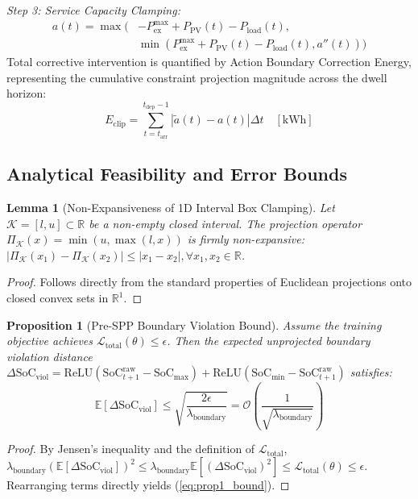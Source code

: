 \documentclass[journal]{IEEEtran}
\newtheorem{lemma}{Lemma}
\newtheorem{proposition}{Proposition}
\theoremstyle{remark}
\begin{document}
\textit{Step 3: Service Capacity Clamping:}
\begin{align}
a(t) = \max\Big( &-P_{\mathrm{ex}}^{\max} + P_{\mathrm{PV}}(t) - P_{\mathrm{load}}(t), \nonumber\\
&\min\left(P_{\mathrm{ex}}^{\max} + P_{\mathrm{PV}}(t) - P_{\mathrm{load}}(t), a''(t)\right)\Big)
\label{eq:spp_step3}
\end{align}
Total corrective intervention is quantified by Action Boundary Correction Energy, representing the cumulative constraint projection magnitude across the dwell horizon:
\begin{equation}
E_{\mathrm{clip}} = \sum_{t=t_{\mathrm{arr}}}^{t_{\mathrm{dep}}-1} |\tilde{a}(t) - a(t)| \Delta t \quad [\text{kWh}]
\label{eq:e_clip}
\end{equation}

\subsection{Analytical Feasibility and Error Bounds}
\begin{lemma}[Non-Expansiveness of 1D Interval Box Clamping]
Let $\mathcal{K} = [l, u] \subset \mathbb{R}$ be a non-empty closed interval. The projection operator $\Pi_{\mathcal{K}}(x) = \min(u, \max(l, x))$ is firmly non-expansive: $|\Pi_{\mathcal{K}}(x_1) - \Pi_{\mathcal{K}}(x_2)| \le |x_1 - x_2|, \forall x_1, x_2 \in \mathbb{R}$.
\end{lemma}
\begin{proof}
Follows directly from the standard properties of Euclidean projections onto closed convex sets in $\mathbb{R}^1$.
\end{proof}

\begin{proposition}[Pre-SPP Boundary Violation Bound]
Assume the training objective achieves $\mathcal{L}_{\mathrm{total}}(\theta) \le \epsilon$. Then the expected unprojected boundary violation distance $\Delta \mathrm{SoC}_{\mathrm{viol}} = \mathrm{ReLU}(\mathrm{SoC}_{t+1}^{\mathrm{raw}} - \mathrm{SoC}_{\max}) + \mathrm{ReLU}(\mathrm{SoC}_{\min} - \mathrm{SoC}_{t+1}^{\mathrm{raw}})$ satisfies:
\begin{equation}
\mathbb{E}[\Delta \mathrm{SoC}_{\mathrm{viol}}] \le \sqrt{\frac{2\epsilon}{\lambda_{\mathrm{boundary}}}} = \mathcal{O}\left(\frac{1}{\sqrt{\lambda_{\mathrm{boundary}}}}\right)
\label{eq:prop1_bound}
\end{equation}
\end{proposition}
\begin{proof}
By Jensen's inequality and the definition of $\mathcal{L}_{\mathrm{total}}$, $\lambda_{\mathrm{boundary}} (\mathbb{E}[\Delta \mathrm{SoC}_{\mathrm{viol}}])^2 \le \lambda_{\mathrm{boundary}} \mathbb{E}[(\Delta \mathrm{SoC}_{\mathrm{viol}})^2] \le \mathcal{L}_{\mathrm{total}}(\theta) \le \epsilon$. Rearranging terms directly yields (\ref{eq:prop1_bound}).
\end{proof}
\end{document}
